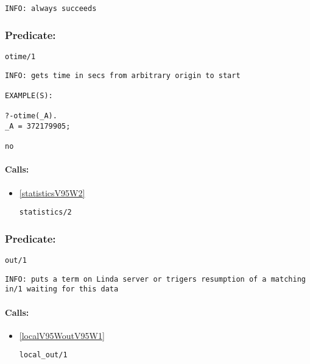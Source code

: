 {\small \begin{verbatim}
INFO: always succeeds

\end{verbatim}}

\subsubsection{Predicate:} \label{otimeV95W1}

\begin{verbatim}
otime/1
\end{verbatim}

{\small \begin{verbatim}
INFO: gets time in secs from arbitrary origin to start

EXAMPLE(S):

?-otime(_A).
_A = 372179905;

no

\end{verbatim}}
\paragraph{Calls:} 
\begin{itemize}
\item \ref{statisticsV95W2} 
\begin{verbatim}
statistics/2
\end{verbatim}

\end{itemize}

\subsubsection{Predicate:} \label{outV95W1}

\begin{verbatim}
out/1
\end{verbatim}

{\small \begin{verbatim}
INFO: puts a term on Linda server or trigers resumption of a matching in/1 waiting for this data

\end{verbatim}}
\paragraph{Calls:} 
\begin{itemize}
\item \ref{localV95WoutV95W1} 
\begin{verbatim}
local_out/1
\end{verbatim}

\end{itemize}


